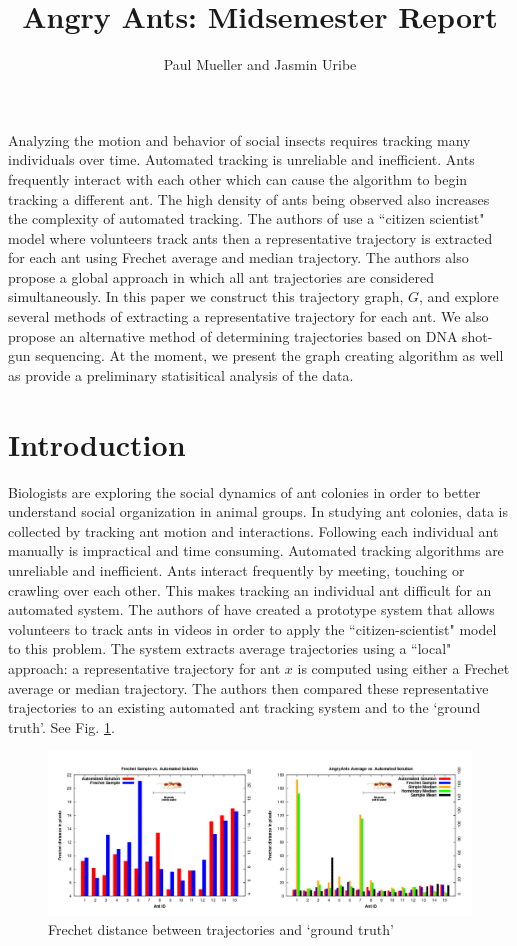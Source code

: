 \documentclass[12pt]{article}
\begin{document}
\title{Angry Ants: Midsemester Report}
\author{Paul Mueller and Jasmin Uribe}
\maketitle
\abstract Analyzing the motion and behavior of social insects requires tracking many individuals over time. Automated tracking is unreliable and inefficient. Ants frequently interact with each other which can cause the algorithm to begin tracking a different ant. The high density of ants being observed also increases the complexity of automated tracking. The authors of \cite{Joy12} use a ``citizen scientist" model where volunteers track ants then a representative trajectory is extracted for each ant using Frechet average and median trajectory. The authors also propose a global approach in which all ant trajectories are considered simultaneously. In this paper we construct this trajectory graph, $G$, and explore several methods of extracting a representative trajectory for each ant. We also propose an alternative method of determining trajectories based on DNA shot-gun sequencing. At the moment, we present the graph creating algorithm as well as provide a preliminary statisitical analysis of the data.

\section{Introduction}
\indent Biologists are exploring the social dynamics of ant colonies in order to better understand social organization in animal groups. In studying ant colonies, data is collected by tracking ant motion and interactions. Following each individual ant manually is impractical and time consuming. Automated tracking algorithms are unreliable and inefficient. Ants interact frequently by meeting, touching or crawling over each other. This makes tracking an individual ant difficult for an automated system. 
\indent The authors of \cite{Joy12} have created a prototype system that allows volunteers to track ants in videos in order to apply the ``citizen-scientist" model to this problem. The system extracts average trajectories using a ``local" approach: a representative trajectory for ant $x$ is computed using either a Frechet average or median trajectory. The authors then compared these representative trajectories to an existing automated ant tracking system and to the `ground truth'. See Fig. \ref{fig:ALocal}.

\begin{figure}
\centering
\includegraphics[width = 6.2in]{AntsJU.png}
\caption{Frechet distance between trajectories and `ground truth' \cite{Joy12}}
\label{fig:ALocal}
\end{figure}
\end{document}
